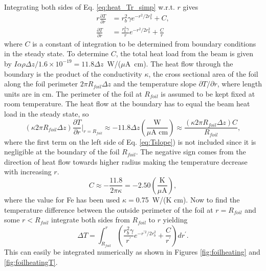 \documentclass[12pt]{article}
\begin{document}
Integrating both sides of Eq. \ref{eq:heat_Tr_simp} w.r.t. $r$ gives
\begin{align}
r\frac{\partial T}{\partial r}&=r_b^2\gamma e^{-r^2/2r_b^2}+C,\\
\label{eq:Tslope}
\frac{\partial T}{\partial r}&=\frac{r_b^2\gamma}{r} e^{-r^2/2r_b^2}+\frac{C}{r}
\end{align} 
where $C$ is a constant of integration to be determined from boundary conditions in the steady state. To determine $C$, the total heat load from the beam is given by $I\alpha\rho\Delta z/1.6\times10^{-19}=11.8\Delta z$~W/($\mu$A~cm). The heat flow through the boundary is the product of the conductivity $\kappa$, the cross sectional area of the foil along the foil perimeter $2\pi R_{foil}\Delta z$ and the temperature slope $\partial T /\partial r$, where  length units are in cm. The perimeter of the foil at $R_{foil}$ is assumed to be kept fixed at room temperature. The heat flow at the boundary has to equal the beam heat load in the steady state, so 
\[
\left(\kappa2\pi R_{foil}\Delta z\right) \frac{\partial T}{\partial r}|_{r=R_{foil}}\approx-11.8\Delta z\left(\frac{\textrm{W}}{\mu \textrm{A cm}}\right)\approx\frac{\left(\kappa2\pi R_{foil}\Delta z\right) C}{R_{foil}},
\]
where the first term on the left side of Eq. \ref{eq:Tslope}) is not included since it is negligible at the boundary of the foil $R_{foil}$. The negative sign comes from the direction of heat flow towards higher radius making the temperature decrease with increasing $r$.
\[
C\approx-\frac{11.8}{2\pi\kappa}=-2.50\left(\frac{\textrm{K}}{\mu\textrm{A}}\right),
\]
where the value for Fe has been used $\kappa=$0.75~W/(K cm). Now to find the temperature difference between the outside perimeter of the foil at $r=R_{foil}$ and some $r<R_{foil}$ integrate both sides from $R_{foil}$ to $r$ yielding
\begin{equation}
\label{eq:dT}
\Delta T = \int_{R_{foil}}^r \left(\frac{r_b^2\gamma}{r^{\prime}} e^{-r^{\prime 2}/2r_b^2}+\frac{C}{r^{\prime}}\right)dr^{\prime}.
\end{equation}
This can easily be integrated numerically as shown in Figures  \ref{fig:foilheating} and \ref{fig:foilheatingT}.
\end{document}
